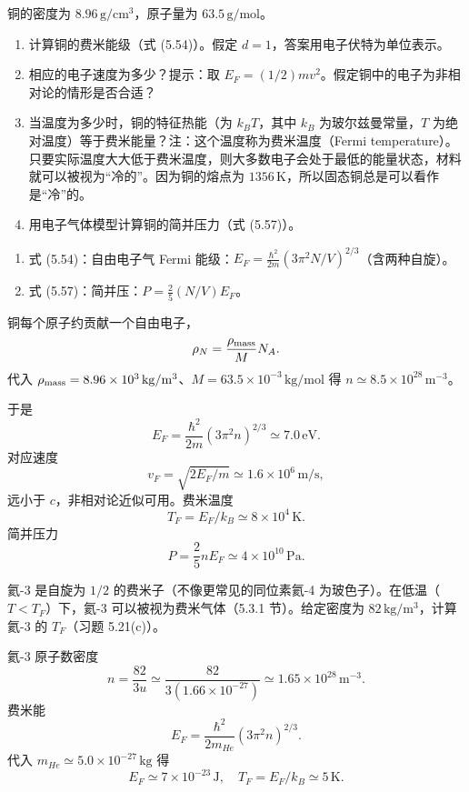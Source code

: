 \begin{question}
铜的密度为 $8.96\,\mathrm{g/cm^3}$，原子量为 $63.5\,\mathrm{g/mol}$。
\begin{enumerate}
\item 计算铜的费米能级（式 (5.54)）。假定 $d=1$，答案用电子伏特为单位表示。
\item 相应的电子速度为多少？提示：取 $E_F=(1/2)mv^2$。假定铜中的电子为非相对论的情形是否合适？
\item 当温度为多少时，铜的特征热能（为 $k_B T$，其中 $k_B$ 为玻尔兹曼常量，$T$ 为绝对温度）等于费米能量？注：这个温度称为费米温度（Fermi temperature）。只要实际温度大大低于费米温度，则大多数电子会处于最低的能量状态，材料就可以被视为“冷的”。因为铜的熔点为 $1356\,\mathrm K$，所以固态铜总是可以看作是“冷”的。
\item 用电子气体模型计算铜的简并压力（式 (5.57)）。
\end{enumerate}

\par\smallskip
{}
\begin{enumerate}[leftmargin=2.2em,itemsep=0.12em,topsep=0.12em,parsep=0pt]
\item 式 (5.54)：自由电子气 Fermi 能级：$E_F=\frac{\hbar^2}{2m}(3\pi^2N/V)^{2/3}$（含两种自旋）。
\item 式 (5.57)：简并压：$P=\frac25(N/V)E_F$。
\end{enumerate}

\end{question}
\begin{solution}

铜每个原子约贡献一个自由电子，
\[
\rho_N=\frac{\rho_{\rm mass}}{M}N_A.
\]
代入 $\rho_{\rm mass}=8.96\times10^3\,\mathrm{kg/m^3}$、$M=63.5\times10^{-3}\,\mathrm{kg/mol}$ 得 $n\simeq8.5\times10^{28}\,\mathrm{m^{-3}}$。

于是
\[
E_F=\frac{\hbar^2}{2m}(3\pi^2n)^{2/3}\simeq7.0\,\mathrm{eV}.
\]
对应速度
\[
v_F=\sqrt{2E_F/m}\simeq1.6\times10^6\,\mathrm{m/s},
\]
远小于 $c$，非相对论近似可用。费米温度
\[
T_F=E_F/k_B\simeq8\times10^4\,\mathrm K.
\]
简并压力
\[
P=\frac25nE_F\simeq4\times10^{10}\,\mathrm{Pa}.
\]

\end{solution}

\begin{question}
氦-3 是自旋为 $1/2$ 的费米子（不像更常见的同位素氦-4 为玻色子）。在低温（$T<T_F$）下，氦-3 可以被视为费米气体（5.3.1 节）。给定密度为 $82\,\mathrm{kg/m^3}$，计算氦-3 的 $T_F$（习题 5.21(c)）。
\end{question}
\begin{solution}

氦-3 原子数密度
\[
n=\frac{82}{3u}\simeq\frac{82}{3(1.66\times10^{-27})}\simeq1.65\times10^{28}\,\mathrm{m^{-3}}.
\]
费米能
\[
E_F=\frac{\hbar^2}{2m_{He}}(3\pi^2n)^{2/3}.
\]
代入 $m_{He}\simeq5.0\times10^{-27}\,\mathrm{kg}$ 得
\[
E_F\simeq7\times10^{-23}\,\mathrm J,
\quad
T_F=E_F/k_B\simeq5\,\mathrm K.
\]

\end{solution}


